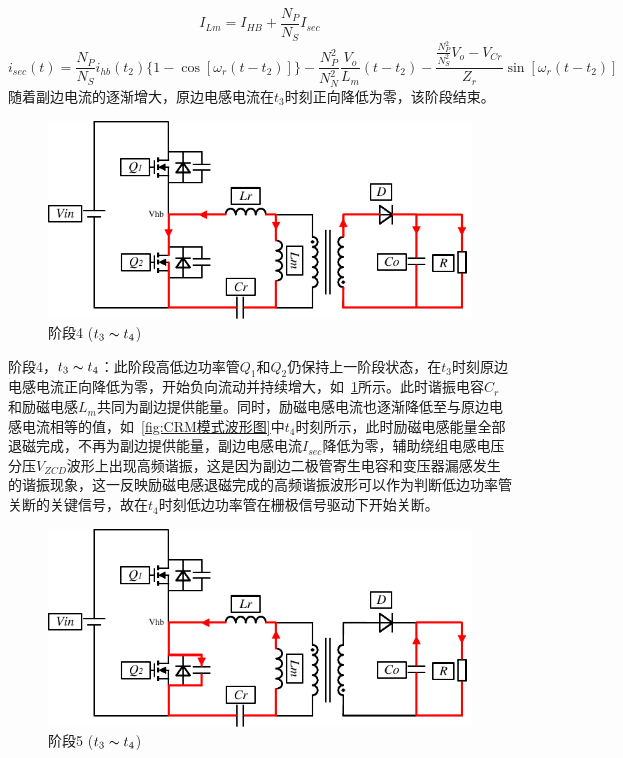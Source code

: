 \begin{equation}
    \label{eq:Ihb公式6}
    I_{Lm} = I_{HB} + \frac{N_P}{N_S}I_{sec}
\end{equation}
\begin{equation}
    \label{eq:Isec公式1}
    i_{sec}(t) 
    = \frac{N_P}{N_S} i_{hb}(t_2) \{  1 - \cos[\omega_r(t-t_2)]\}  - \frac{N_P^2}{N_N^2} \frac{V_o}{L_m} (t-t_2)
    - \frac{\frac{N_P^2}{N_S^2} V_o - V_{Cr}}{Z_r} \sin[\omega_r(t-t_2)]
\end{equation}
随着副边电流的逐渐增大，原边电感电流在$t_3$时刻正向降低为零，该阶段结束。



\begin{figure}[htbp] 
    \centering
    \includegraphics[width=0.8\linewidth]{figures/工作原理4.pdf}
    \caption{阶段4 ($t_3 \thicksim t_4$)}
    \label{fig:工作原理4}
\end{figure}

阶段4，$t_3 \thicksim t_4$：此阶段高低边功率管$Q_1$和$Q_2$仍保持上一阶段状态，在$t_3$时刻原边电感电流正向降低为零，开始负向流动并持续增大，如~\ref{fig:工作原理4}所示。此时谐振电容$C_r$和励磁电感$L_m$共同为副边提供能量。同时，励磁电感电流也逐渐降低至与原边电感电流相等的值，如~\ref{fig:CRM模式波形图}中$t_4$时刻所示，此时励磁电感能量全部退磁完成，不再为副边提供能量，副边电感电流$I_{sec}$降低为零，辅助绕组电感电压分压$V_{ZCD}$波形上出现高频谐振，这是因为副边二极管寄生电容和变压器漏感发生的谐振现象，这一反映励磁电感退磁完成的高频谐振波形可以作为判断低边功率管关断的关键信号，故在$t_4$时刻低边功率管在栅极信号驱动下开始关断。

\begin{figure}[htbp] 
    \centering
    \includegraphics[width=0.8\linewidth]{figures/工作原理5.pdf}
    \caption{阶段5 ($t_3 \thicksim t_4$)}
    \label{fig:工作原理5}
\end{figure}
                
